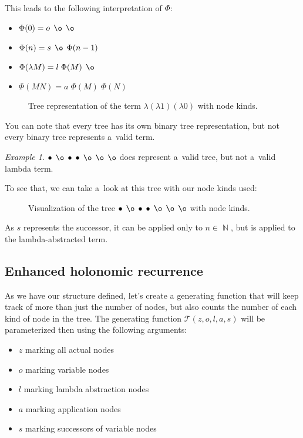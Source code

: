 \documentclass[final]{article}
\theoremstyle{definition}
\theoremstyle{definition}
\theoremstyle{remark}
\newtheorem{example}{Example}[subsection]
\newcommand{\gf}[1]{\ensuremath{\mathcal{#1}}}
\DeclareMathOperator{\N}{\mathbb{N}}
\DeclareMathOperator{\n}{\bullet}
\DeclareMathOperator{\no}{\o}
\begin{document}
This leads to the following interpretation of \(\Phi\):

\begin{itemize}
    \item \(\Phi(0) = o\; \no\; \no\)
    \item \(\Phi(n) = s\; \no\; \Phi(n - 1)\)
    \item \(\Phi(\lambda M) = l\; \Phi(M)\; \no\)
    \item \(\Phi(M N) = a\; \Phi(M)\; \Phi(N)\)
\end{itemize}

\begin{figure}[H]
    \centering
    
    \caption{Tree representation of the term \(\lambda (\lambda 1) (\lambda 0)\) with node kinds.}%
    \label{fig:lambda_tree_example_3}
\end{figure}

You can note that every tree has its own binary tree representation, but not every binary tree represents a~valid term.

\begin{example}
    \(\n\; \no\; \n\; \n\; \no\; \no\; \no\) does represent a~valid tree, but not a~valid lambda term.

To see that, we can take a~look at this tree with our node kinds used:

\begin{figure}[H]
    \centering
    
    \caption{Visualization of the tree \(\n\; \no\; \n\; \n\; \no\; \no\; \no\) with node kinds.}%
    \label{fig:lambda_tree_invalid}
\end{figure}

As \(s\) represents the successor, it can be applied only to \(n \in \N\), but is applied to the lambda-abstracted term.
\end{example}

\subsection{Enhanced holonomic recurrence}%
\label{sub:enhanced_holonomic_reccurence}

As we have our structure defined, let's create a generating function that will keep track of more than just the number of nodes, but also counts the number of each kind of node in the tree. The generating function \(\gf{T}(z, o, l, a, s)\) will be parameterized then using the following arguments:
\begin{itemize}
    \item \(z\) marking all actual nodes
    \item \(o\) marking variable nodes
    \item \(l\) marking lambda abstraction nodes
    \item \(a\) marking application nodes
    \item \(s\) marking successors of variable nodes
\end{itemize}
\end{document}
